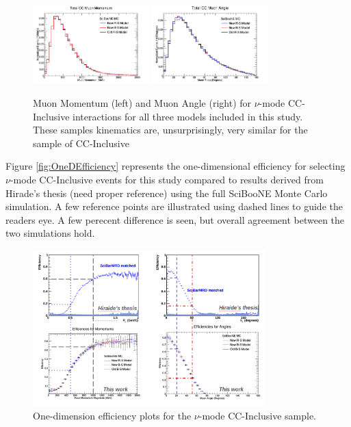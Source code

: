 \documentclass[11pt]{article}
\begin{document}
\begin{figure}[H]
\centering
\includegraphics[width=0.4\textwidth]{CCInclusivePlots/NMCCInclusiveTotalMomentum.png}
\includegraphics[width=0.4\textwidth]{CCInclusivePlots/NMCCInclusiveTotalAngle.png}
\caption{Muon Momentum (left) and Muon Angle (right) for $\nu$-mode CC-Inclusive interactions for all three models included in this study. These samples kinematics are, unsurprisingly, very similar for the sample of CC-Inclusive}
\end{figure}\label{fig:NuModeCCInclusiveMomAndAng}


Figure \ref{fig:OneDEfficiency} represents the one-dimensional efficiency for selecting $\nu$-mode CC-Inclusive events for this study compared to results derived from Hirade's thesis (need proper reference) using the full SciBooNE Monte Carlo simulation. A few reference points are illustrated using dashed lines to guide the readers eye. A few perecent difference is seen, but overall agreement between the two simulations hold. 

\begin{figure}[H]
\centering
\includegraphics[width=0.8\textwidth]{CCInclusivePlots/CCInc1DEff.png}
\caption{One-dimension efficiency plots for the $\nu$-mode CC-Inclusive sample.}
\end{figure}\label{fig:OneDEfficiency}
\end{document}
